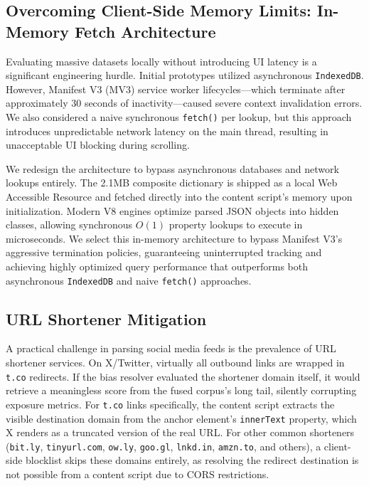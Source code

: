 \documentclass[10pt, conference, compsoc]{IEEEtran}
\begin{document}
\subsection{Overcoming Client-Side Memory Limits: In-Memory Fetch Architecture}
Evaluating massive datasets locally without introducing UI latency is a significant engineering hurdle. Initial prototypes utilized asynchronous \texttt{IndexedDB}. However, Manifest V3 (MV3) service worker lifecycles—which terminate after approximately 30 seconds of inactivity—caused severe context invalidation errors. We also considered a naive synchronous \texttt{fetch()} per lookup, but this approach introduces unpredictable network latency on the main thread, resulting in unacceptable UI blocking during scrolling.

We redesign the architecture to bypass asynchronous databases and network lookups entirely. The 2.1MB composite dictionary is shipped as a local Web Accessible Resource and fetched directly into the content script's memory upon initialization. Modern V8 engines optimize parsed JSON objects into hidden classes, allowing synchronous $O(1)$ property lookups to execute in microseconds. We select this in-memory architecture to bypass Manifest V3's aggressive termination policies, guaranteeing uninterrupted tracking and achieving highly optimized query performance that outperforms both asynchronous \texttt{IndexedDB} and naive \texttt{fetch()} approaches.

\subsection{URL Shortener Mitigation}
A practical challenge in parsing social media feeds is the prevalence of URL shortener services. On X/Twitter, virtually all outbound links are wrapped in \texttt{t.co} redirects. If the bias resolver evaluated the shortener domain itself, it would retrieve a meaningless score from the fused corpus's long tail, silently corrupting exposure metrics. For \texttt{t.co} links specifically, the content script extracts the visible destination domain from the anchor element's \texttt{innerText} property, which X renders as a truncated version of the real URL. For other common shorteners (\texttt{bit.ly}, \texttt{tinyurl.com}, \texttt{ow.ly}, \texttt{goo.gl}, \texttt{lnkd.in}, \texttt{amzn.to}, and others), a client-side blocklist skips these domains entirely, as resolving the redirect destination is not possible from a content script due to CORS restrictions.
\end{document}
